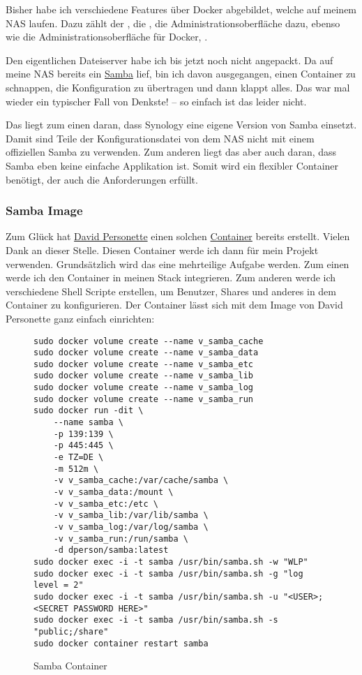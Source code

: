 \documentclass[12pt,a4paper]{article}
\newcommand{\jpaquote}[1]{\glqq{}#1\grqq{}}
\begin{document}
Bisher habe ich verschiedene Features über Docker abgebildet, welche auf meinem NAS laufen. Dazu zählt der
, die , die Administrationsoberfläche  dazu,
ebenso wie die Administrationsoberfläche für Docker, .

Den eigentlichen Dateiserver habe ich bis jetzt noch nicht angepackt. Da auf meine NAS bereits ein
\href{https://www.samba.org/}{Samba} lief, bin ich davon ausgegangen, einen Container zu schnappen, die Konfiguration
zu übertragen und dann klappt alles. Das war mal wieder ein typischer Fall von \jpaquote{Denkste!} -- so einfach ist das
leider nicht.

Das liegt zum einen daran, dass Synology eine eigene Version von Samba einsetzt. Damit sind Teile der Konfigurationsdatei
von dem NAS nicht mit einem offiziellen Samba zu verwenden. Zum anderen liegt das aber auch daran, dass Samba eben keine
einfache Applikation ist. Somit wird ein flexibler Container benötigt, der auch die Anforderungen erfüllt.

\subsubsection{Samba Image}
Zum Glück hat \href{https://github.com/dperson}{David Personette} einen solchen \href{https://hub.docker.com/r/dperson/samba}{Container}
bereits erstellt. Vielen Dank an dieser Stelle. Diesen Container werde ich dann für mein Projekt verwenden.
Grundsätzlich wird das eine mehrteilige Aufgabe werden. Zum einen werde ich den Container in meinen Stack integrieren.
Zum anderen werde ich verschiedene Shell Scripte erstellen, um Benutzer, Shares und anderes in dem Container zu
konfigurieren. Der Container lässt sich mit dem Image von David Personette ganz einfach einrichten:

\begin{figure}[H]
\begin{lstlisting}
sudo docker volume create --name v_samba_cache
sudo docker volume create --name v_samba_data
sudo docker volume create --name v_samba_etc
sudo docker volume create --name v_samba_lib
sudo docker volume create --name v_samba_log
sudo docker volume create --name v_samba_run
sudo docker run -dit \
    --name samba \
    -p 139:139 \
    -p 445:445 \
    -e TZ=DE \
    -m 512m \
    -v v_samba_cache:/var/cache/samba \
    -v v_samba_data:/mount \
    -v v_samba_etc:/etc \
    -v v_samba_lib:/var/lib/samba \
    -v v_samba_log:/var/log/samba \
    -v v_samba_run:/run/samba \
    -d dperson/samba:latest
sudo docker exec -i -t samba /usr/bin/samba.sh -w "WLP"
sudo docker exec -i -t samba /usr/bin/samba.sh -g "log level = 2"
sudo docker exec -i -t samba /usr/bin/samba.sh -u "<USER>;<SECRET PASSWORD HERE>"
sudo docker exec -i -t samba /usr/bin/samba.sh -s "public;/share"
sudo docker container restart samba
\end{lstlisting}
\caption{Samba Container}\label{fig:Samba Container}
\end{figure}
\end{document}
